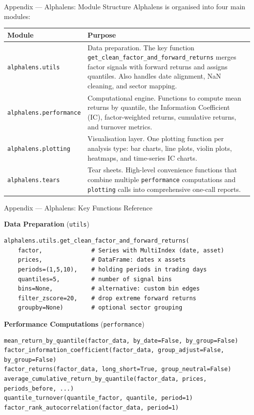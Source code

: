 \documentclass[aspectratio=169, 11pt]{beamer}
\begin{document}
%
\begin{frame}{Appendix --- Alphalens: Module Structure}
\footnotesize
Alphalens is organised into four main modules:

\vspace{0.3cm}

\renewcommand{\arraystretch}{1.35}
\centering
\begin{tabular}{@{}lp{10cm}@{}}
\toprule
\textbf{Module} & \textbf{Purpose} \\
\midrule
\texttt{alphalens.utils} &
  Data preparation. The key function \texttt{get\_clean\_factor\_and\_forward\_returns} merges factor signals with forward returns and assigns quantiles. Also handles date alignment, NaN cleaning, and sector mapping. \\
\texttt{alphalens.performance} &
  Computational engine. Functions to compute mean returns by quantile, the Information Coefficient (IC), factor-weighted returns, cumulative returns, and turnover metrics. \\
\texttt{alphalens.plotting} &
  Visualisation layer. One plotting function per analysis type: bar charts, line plots, violin plots, heatmaps, and time-series IC charts. \\
\texttt{alphalens.tears} &
  Tear sheets. High-level convenience functions that combine multiple \texttt{performance} computations and \texttt{plotting} calls into comprehensive one-call reports. \\
\bottomrule
\end{tabular}

\end{frame}
%
%
\begin{frame}[fragile]{Appendix --- Alphalens: Key Functions Reference}

\small

\textbf{Data Preparation} (\texttt{utils})
\begin{lstlisting}
alphalens.utils.get_clean_factor_and_forward_returns(
    factor,              # Series with MultiIndex (date, asset)
    prices,              # DataFrame: dates x assets
    periods=(1,5,10),    # holding periods in trading days
    quantiles=5,         # number of signal bins
    bins=None,           # alternative: custom bin edges
    filter_zscore=20,    # drop extreme forward returns
    groupby=None)        # optional sector grouping
\end{lstlisting}

\textbf{Performance Computations} (\texttt{performance})
\begin{lstlisting}
mean_return_by_quantile(factor_data, by_date=False, by_group=False)
factor_information_coefficient(factor_data, group_adjust=False, by_group=False)
factor_returns(factor_data, long_short=True, group_neutral=False)
average_cumulative_return_by_quantile(factor_data, prices, periods_before, ...)
quantile_turnover(quantile_factor, quantile, period=1)
factor_rank_autocorrelation(factor_data, period=1)
\end{lstlisting}

\end{frame}
\end{document}
